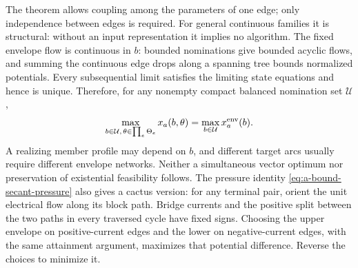 The theorem allows coupling among the parameters of one edge; only
independence between edges is required. For general continuous families
it is structural: without an input representation it implies no
algorithm. The fixed envelope flow is continuous in $b$: bounded nominations give
bounded acyclic flows, and summing the continuous edge drops along a
spanning tree bounds normalized potentials. Every subsequential limit
satisfies the limiting state equations and hence is unique. Therefore,
for any nonempty compact balanced nomination set $\mathcal U$,
\[
 \max_{b\in\mathcal U,\,\theta\in\prod_e\Theta_e}x_a(b,\theta)
 =\max_{b\in\mathcal U}x_a^{\rm env}(b).
\]
A realizing member profile may depend on $b$, and different target arcs
usually require different envelope networks. Neither a simultaneous
vector optimum nor preservation of existential feasibility follows.
The pressure identity \cref{eq:a-bound-secant-pressure} also gives a
cactus version: for any terminal pair, orient the unit electrical flow
along its block path. Bridge currents and the positive split between
the two paths in every traversed cycle have fixed signs. Choosing the
upper envelope on positive-current edges and the lower on negative-current
edges, with the same attainment argument, maximizes that potential
difference. Reverse the choices to minimize it.

